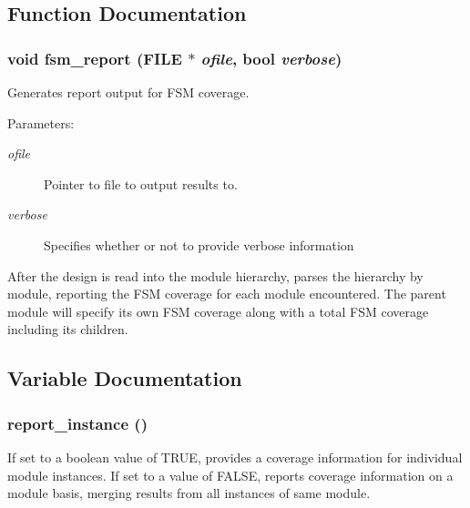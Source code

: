 \subsection{Function Documentation}
\subsubsection{\setlength{\rightskip}{0pt plus 5cm}void fsm\_\-report (FILE $\ast$ {\em ofile}, {\bf bool} {\em verbose})}\label{fsm_8c_a1}


Generates report output for FSM coverage. 

\begin{Desc}
\item[Parameters:]
\begin{description}
\item[{\em ofile}]Pointer to file to output results to. \item[{\em verbose}]Specifies whether or not to provide verbose information\end{description}
\end{Desc}
After the design is read into the module hierarchy, parses the hierarchy by module, reporting the FSM coverage for each module encountered. The parent module will specify its own FSM coverage along with a total FSM coverage including its children. 

\subsection{Variable Documentation}
\subsubsection{ {\bf report\_\-instance} ()}\label{fsm_8c_a0}


If set to a boolean value of TRUE, provides a coverage information for individual module instances. If set to a value of FALSE, reports coverage information on a module basis, merging results from all instances of same module. 